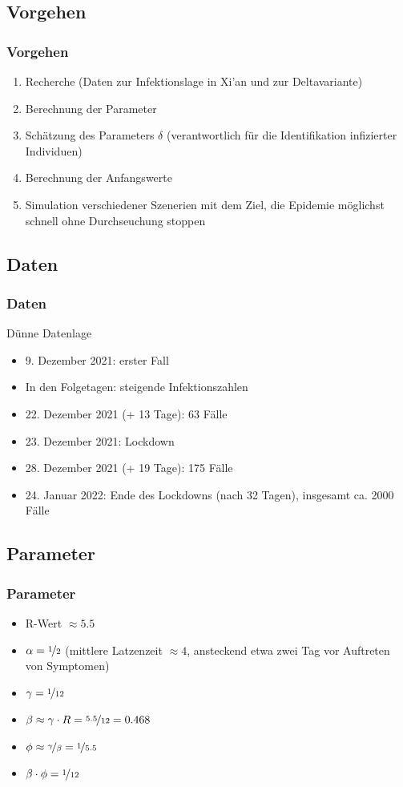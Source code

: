 \documentclass{beamer}
\begin{document}
\subsection{Vorgehen}
\begin{frame}
	\frametitle{Vorgehen}
	\begin{enumerate}
		\item Recherche (Daten zur Infektionslage in Xi'an und zur Deltavariante)
		\item Berechnung der Parameter
		\item Schätzung des Parameters $\delta$ (verantwortlich für die Identifikation infizierter Individuen)
		\item Berechnung der Anfangswerte
		\item Simulation verschiedener Szenerien mit dem Ziel, die Epidemie möglichst schnell ohne Durchseuchung stoppen
	\end{enumerate}
\end{frame}

\subsection{Daten}
\begin{frame}
	\frametitle{Daten}
	Dünne Datenlage
	\begin{itemize}
		\item 9. Dezember 2021: erster Fall
		\item In den Folgetagen: steigende Infektionszahlen
		\item 22. Dezember 2021 (+ 13 Tage): 63 Fälle
		\item 23. Dezember 2021: Lockdown
		\item 28. Dezember 2021 (+ 19 Tage): 175 Fälle
		\item 24. Januar 2022: Ende des Lockdowns (nach 32 Tagen), insgesamt ca. 2000 Fälle
	\end{itemize}
\end{frame}

\subsection{Parameter}
\begin{frame}
	\frametitle{Parameter}
	\begin{itemize}
		\item R-Wert $\approx 5.5$
		\item $\alpha = \nicefrac{1}{2}$ (mittlere Latzenzeit $\approx 4$, ansteckend etwa zwei Tag vor Auftreten von Symptomen)
		\item $\gamma = \nicefrac{1}{12}$
		\item $\beta \approx \gamma \cdot R = \nicefrac{5.5}{12} = 0.468$
		\item $\phi \approx \nicefrac{\gamma}{\beta} = \nicefrac{1}{5.5} $
		\item $\beta \cdot \phi = \nicefrac{1}{12}$
	\end{itemize}
\end{frame}
\end{document}
